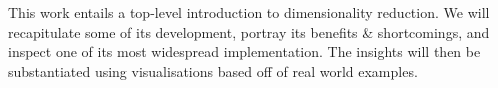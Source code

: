 
\begin{sciabstract}
This work entails a top-level introduction to dimensionality reduction.
We will recapitulate some of its development, portray its benefits \& shortcomings, and inspect one of its most widespread implementation.
The insights will then be substantiated using visualisations based off of real world examples.
\end{sciabstract}

\clearpage
